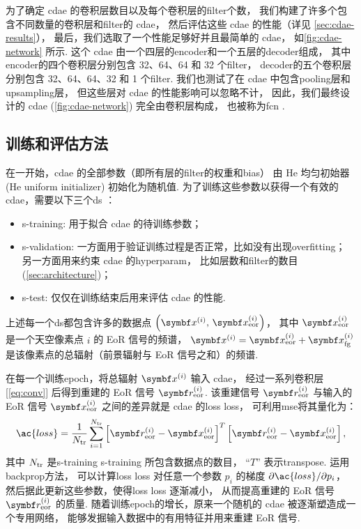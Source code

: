 为了确定 \ac{cdae} 的卷积层数目以及每个卷积层的\ac{filter}个数，
我们构建了许多个包含不同数量的卷积层和\ac{filter}的 \ac{cdae}，
然后评估这些 \ac{cdae} 的性能（详见 \autoref{sec:cdae-results}），
最后，我们选取了一个性能足够好并且最简单的 \ac{cdae}，
如\autoref{fig:cdae-network} 所示.
这个 \ac{cdae} 由一个四层的\ac{encoder}和一个五层的\ac{decoder}组成，
其中\ac{encoder}的四个卷积层分别包含 32、64、64 和 32 个\ac{filter}，
\ac{decoder}的五个卷积层分别包含 32、64、64、32 和 1 个\ac{filter}.
我们也测试了在 \ac{cdae} 中包含\ac{pooling}层和\ac{upsampling}层，
但这些层对 \ac{cdae} 的性能影响可以忽略不计，
因此，我们最终设计的 \ac{cdae} (\autoref{fig:cdae-network}) 完全由卷积层构成，
也被称为\ac{fcn} \cite{long2015,springenberg2015}.

\subsection{训练和评估方法}
\label{sec:train-eval}

在一开始，\ac{cdae} 的全部参数（即所有层的\ac{filter}的权重和\ac{bias}）
由 He 均匀初始器 (He uniform initializer)\cite{he2015} 初始化为随机值.
为了训练这些参数以获得一个有效的 \ac{cdae}，需要以下三个\ac{ds} \cite{ripley1996}：
\begin{itemize}
  \item \ac{s-training}:
    用于拟合 \ac{cdae} 的待训练参数；
  \item \ac{s-validation}:
    一方面用于验证训练过程是否正常，比如没有出现\ac{overfitting}；
    另一方面用来约束 \ac{cdae} 的\ac{hyperparam}，
    比如层数和\ac{filter}的数目 (\autoref{sec:architecture})；
  \item \ac{s-test}:
    仅仅在训练结束后用来评估 \ac{cdae} 的性能.
\end{itemize}
上述每一个\ac{ds}都包含许多的数据点
$\left( \B{x}^{(i)}, \,\B{x}^{(i)}_{\R{eor}} \right)$，
其中 $\B{x}^{(i)}_{\R{eor}}$ 是一个天空像素点 $i$ 的 EoR 信号的频谱，
$\B{x}^{(i)} = \B{x}^{(i)}_{\R{eor}} + \B{x}^{(i)}_{\R{fg}}$
是该像素点的总辐射（前景辐射与 EoR 信号之和）的频谱.

在每一个训练\ac{epoch}，将总辐射 $\B{x}^{(i)}$ 输入 \ac{cdae}，
经过一系列卷积层 [\autoref{eq:conv}]
后得到重建的 EoR 信号 $\B{r}^{(i)}_{\R{eor}}$.
该重建信号 $\B{r}^{(i)}_{\R{eor}}$ 与输入的 EoR 信号 $\B{x}^{(i)}_{\R{eor}}$
之间的差异就是 \ac{cdae} 的\acl{loss} \ac{loss}，
可利用\ac{mse}将其量化为：
\begin{equation}
  \label{eq:loss}
  \ac{loss} = \frac{1}{N_{\R{tr}}} \sum_{i=1}^{N_{\R{tr}}}
    \left[ \B{r}_{\R{eor}}^{(i)} - \B{x}_{\R{eor}}^{(i)} \right]^T
    \left[ \B{r}_{\R{eor}}^{(i)} - \B{x}_{\R{eor}}^{(i)} \right] ,
\end{equation}
其中 $N_{\mathrm{tr}}$ 是\acl{s-training} \ac{s-training} 所包含数据点的数目，
\enquote{$T$} 表示\ac{transpose}.
运用\ac{backprop}方法\cite{rumelhart1986,leCun1998bp}，
可以计算\acl{loss} \ac{loss} 对任意一个参数 $p_i$ 的梯度
$\partial \ac{loss} / \partial p_i$，
然后据此更新这些参数，使得\acl{loss} \ac{loss} 逐渐减小，
从而提高重建的 EoR 信号 $\B{r}^{(i)}_{\R{eor}}$ 的质量.
随着训练\ac{epoch}的增长，原来一个随机的 \ac{cdae} 被逐渐塑造成一个专用网络，
能够发掘输入数据中的有用特征并用来重建 EoR 信号.

